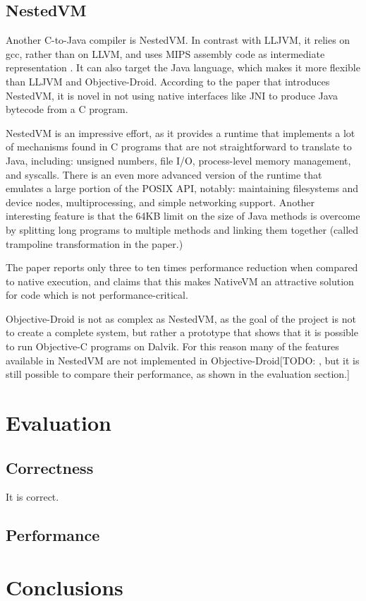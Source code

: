 \documentclass[parskip]{cs4rep}
\begin{document}
\section{NestedVM}

Another C-to-Java compiler is NestedVM. In contrast with LLJVM, it relies on gcc, rather than on LLVM, and uses MIPS assembly code as intermediate representation \cite{AllietMegacz:ivme:2004}. It can also target the Java language, which makes it more flexible than LLJVM and Objective-Droid. According to the paper that introduces NestedVM, it is novel in not using native interfaces like JNI to produce Java bytecode from a C program.

NestedVM is an impressive effort, as it provides a runtime that implements a lot of mechanisms found in C programs that are not straightforward to translate to Java, including: unsigned numbers, file I/O, process-level memory management, and syscalls. There is an even more advanced version of the runtime that emulates a large portion of the POSIX API, notably: maintaining filesystems and device nodes, multiprocessing, and simple networking support. Another interesting feature is that the 64KB limit on the size of Java methods is overcome by splitting long programs to multiple methods and linking them together (called trampoline transformation in the paper.)

The paper reports only three to ten times performance reduction when compared to native execution, and claims that this makes NativeVM an attractive solution for code which is not performance-critical.

Objective-Droid is not as complex as NestedVM, as the goal of the project is not to create a complete system, but rather a prototype that shows that it is possible to run Objective-C programs on Dalvik. For this reason many of the features available in NestedVM are not implemented in Objective-Droid[TODO: , but it is still possible to compare their performance, as shown in the evaluation section.]

\chapter{Evaluation}

\section{Correctness}

It is correct.

\section{Performance}

\chapter{Conclusions}



\end{document}
